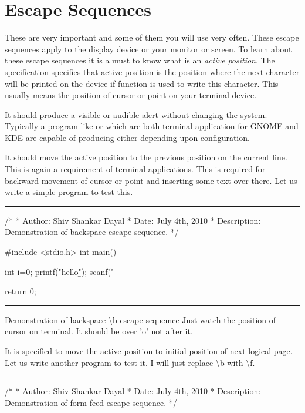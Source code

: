 \section{Escape Sequences}
These are very important and some of them you will use very
often. These escape sequences apply to the display device or your
monitor or screen. To learn about these escape sequences it is a must
to know what is an {\it active position}. The specification specifies
that active position is the position where the next character will be
printed on the device if  function is used to write this
character. This usually means the position of cursor or point on your
terminal device.
\startitemize[n]
\item{}\textreference[alert]It should produce a visible
  or audible alert without changing the system. Typically a program
  like  or  which are both terminal
  application for GNOME and KDE are capable of producing either
  depending upon configuration.
\item{}\textreference[backspace]It should move the
  active position to the previous position on the current line. This
  is again a requirement of terminal applications. This is required
  for backward movement of cursor or point and inserting some text
  over there. Let us write a simple program to test this.
\blank[force,1mm]\hrule\blank[force,1mm]
\startCPP
/*
 * Author: Shiv Shankar Dayal
 * Date: July 4th, 2010
 * Description: Demonstration of backspace escape sequence.
 */

#include <stdio.h>
int main()
{
  int i=0;
  printf("hello\b");
  scanf("%

  return 0;
}
\stopCPP
{}
\hrule
\blank[force,1mm]
\startalignment[middle]
Demonstration of backspace \backslash b escape sequemce
\stopalignment
Just watch the position of cursor on terminal. It should be over 'o' not
after it.
\item{}It is specified to
  move the active position to initial position of next logical
  page. Let us write another program to test it. I will just replace
  \backslash b with \backslash f.
\blank[force,1mm]\hrule\blank[force,1mm]
\startCPP
/*
 * Author: Shiv Shankar Dayal
 * Date: July 4th, 2010
 * Description: Demonstration of form feed escape sequence.
 */

